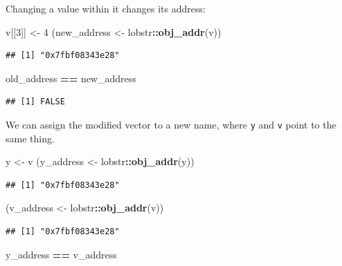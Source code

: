 \documentclass[]{book}
\newenvironment{Shaded}{\begin{snugshade}}{\end{snugshade}}
\newcommand{\DecValTok}[1]{\textcolor[rgb]{0.00,0.00,0.81}{#1}}
\newcommand{\KeywordTok}[1]{\textcolor[rgb]{0.13,0.29,0.53}{\textbf{#1}}}
\newcommand{\NormalTok}[1]{#1}
\newcommand{\OperatorTok}[1]{\textcolor[rgb]{0.81,0.36,0.00}{\textbf{#1}}}
\newcommand{\StringTok}[1]{\textcolor[rgb]{0.31,0.60,0.02}{#1}}
\begin{document}
Changing a value within it changes its address:

\begin{Shaded}
\begin{Highlighting}[]
\NormalTok{v[[}\DecValTok{3}\NormalTok{]] <-}\StringTok{ }\DecValTok{4}
\NormalTok{(new_address <-}\StringTok{ }\NormalTok{lobstr}\OperatorTok{::}\KeywordTok{obj_addr}\NormalTok{(v))}
\end{Highlighting}
\end{Shaded}

\begin{verbatim}
## [1] "0x7fbf08343e28"
\end{verbatim}

\begin{Shaded}
\begin{Highlighting}[]
\NormalTok{old_address }\OperatorTok{==}\StringTok{ }\NormalTok{new_address}
\end{Highlighting}
\end{Shaded}

\begin{verbatim}
## [1] FALSE
\end{verbatim}

We can assign the modified vector to a new name, where \texttt{y} and \texttt{v} point to the same thing.

\begin{Shaded}
\begin{Highlighting}[]
\NormalTok{y <-}\StringTok{ }\NormalTok{v}
\NormalTok{(y_address <-}\StringTok{ }\NormalTok{lobstr}\OperatorTok{::}\KeywordTok{obj_addr}\NormalTok{(y))}
\end{Highlighting}
\end{Shaded}

\begin{verbatim}
## [1] "0x7fbf08343e28"
\end{verbatim}

\begin{Shaded}
\begin{Highlighting}[]
\NormalTok{(v_address <-}\StringTok{ }\NormalTok{lobstr}\OperatorTok{::}\KeywordTok{obj_addr}\NormalTok{(v))}
\end{Highlighting}
\end{Shaded}

\begin{verbatim}
## [1] "0x7fbf08343e28"
\end{verbatim}

\begin{Shaded}
\begin{Highlighting}[]
\NormalTok{y_address }\OperatorTok{==}\StringTok{ }\NormalTok{v_address}
\end{Highlighting}
\end{Shaded}
\end{document}
